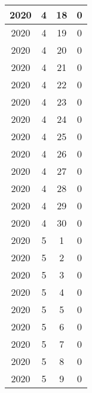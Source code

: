\begin{longtable} {|c|c|c|c|}
\hline
2020         & 4            & 18           & 0                         \\ 
\hline
2020         & 4            & 19           & 0                         \\ 
\hline
2020         & 4            & 20           & 0                         \\ 
\hline
2020         & 4            & 21           & 0                         \\ 
\hline
2020         & 4            & 22           & 0                         \\ 
\hline
2020         & 4            & 23           & 0                         \\ 
\hline
2020         & 4            & 24           & 0                         \\ 
\hline
2020         & 4            & 25           & 0                         \\ 
\hline
2020         & 4            & 26           & 0                         \\ 
\hline
2020         & 4            & 27           & 0                         \\ 
\hline
2020         & 4            & 28           & 0                         \\ 
\hline
2020         & 4            & 29           & 0                         \\ 
\hline
2020         & 4            & 30           & 0                         \\ 
\hline
2020         & 5            & 1            & 0                         \\ 
\hline
2020         & 5            & 2            & 0                         \\ 
\hline
2020         & 5            & 3            & 0                         \\ 
\hline
2020         & 5            & 4            & 0                         \\ 
\hline
2020         & 5            & 5            & 0                         \\ 
\hline
2020         & 5            & 6            & 0                         \\ 
\hline
2020         & 5            & 7            & 0                         \\ 
\hline
2020         & 5            & 8            & 0                         \\ 
\hline
2020         & 5            & 9            & 0                         \\ 

\end{longtable}
